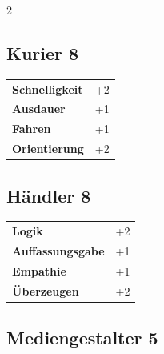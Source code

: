 \begin{multicols}{2}
\begin{tcolorbox}
\end{tcolorbox}

\begin{tcolorbox}
    \subsection*{Kurier \hfill \small{8 }}
    \tcblower




\begin{tabular}{@{}ll@{}}
    \textbf{Schnelligkeit} & +2\\
    \textbf{Ausdauer} & +1\\
    \textbf{Fahren} & +1\\
    \textbf{Orientierung} & +2\\
\end{tabular}


\end{tcolorbox}

\begin{tcolorbox}
    \subsection*{Händler \hfill \small{8 }}
    \tcblower




\begin{tabular}{@{}ll@{}}
    \textbf{Logik} & +2\\
    \textbf{Auffassungsgabe} & +1\\
    \textbf{Empathie} & +1\\
    \textbf{Überzeugen} & +2\\
\end{tabular}


\end{tcolorbox}

\begin{tcolorbox}
    \subsection*{Mediengestalter \hfill \small{5 }}
    \tcblower





\end{tcolorbox}
\end{multicols}
